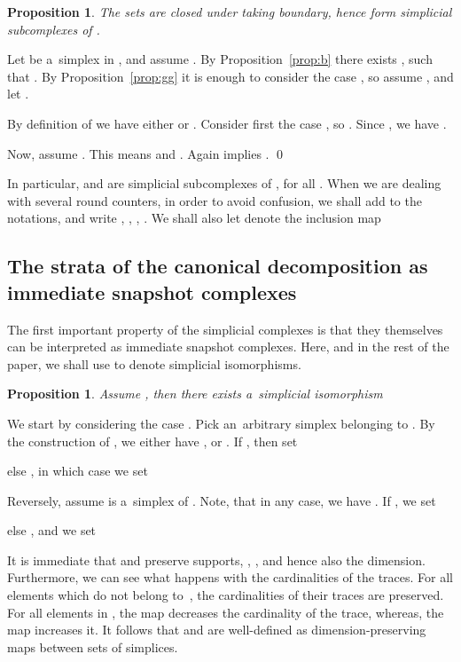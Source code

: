 \documentclass{amsart}[10pt]
\newtheorem{prop}[theorem]{Proposition}
\newcommand{\pr}{\nin{\bf Proof.} }
\numberwithin{equation}{section}
\numberwithin{figure}{section}
\numberwithin{table}{section}
\begin{document}
\begin{prop}
The sets  are closed under taking boundary, hence form
simplicial subcomplexes of .
\end{prop}
\pr Let  be a~simplex in
, and assume . By Proposition~\ref{prop:b}
there exists , such that
. By Proposition~\ref{prop:gg} it is enough to
consider the case , so assume , and let .

By definition of  we have either  or
.  Consider first the case , so
. Since , we have .

Now, assume . This means  and
. Again  implies
.  \qed

\vspace{5pt}

\noindent
In particular,  and  are simplicial subcomplexes of
, for all . When we are dealing with several round
counters, in order to avoid confusion, we shall add  to the
notations, and write , , ,
. We shall also let  denote the inclusion
map 




\subsection{The strata of the canonical decomposition as immediate snapshot complexes}


\nin The first important property of the simplicial complexes
 is that they themselves can be interpreted as immediate
snapshot complexes. Here, and in the rest of the paper, we shall use
 to denote simplicial isomorphisms.

\begin{prop}\label{prop:strata}
Assume , then there exists a~simplicial
isomorphism
 
\end{prop}
\pr We start by considering the case . Pick an~arbitrary
simplex  belonging to .  
By the construction of , we either have , or
. If , then set

else , in which case we set


Reversely, assume  is a~simplex of
. Note, that in any case, we have . If , we set

else , and we set


It is immediate that  and  preserve supports,
, , and hence also the dimension. Furthermore, we can see
what happens with the cardinalities of the traces. For all elements
 which do not belong to~, the cardinalities of their traces are
preserved. For all elements in , the map  decreases the
cardinality of the trace, whereas, the map  increases it. It
follows that  and  are well-defined as
dimension-preserving maps between sets of simplices.
\end{document}
